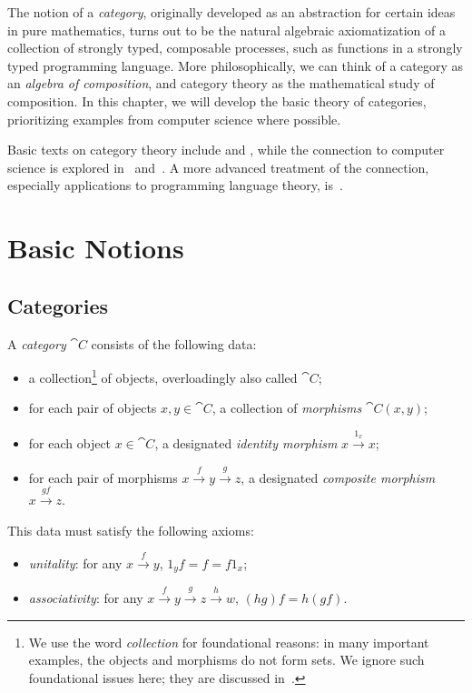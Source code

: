 
The notion of a \emph{category}, originally developed as an abstraction for
certain ideas in pure mathematics, turns out to be the natural algebraic
axiomatization of a collection of strongly typed, composable processes, such as
functions in a strongly typed programming language. More philosophically, we can
think of a category as an \emph{algebra of composition}, and category theory as
the mathematical study of composition. In this chapter, we will
develop the basic theory of categories, prioritizing examples from computer
science where possible.

Basic texts on category theory include \cite{maclane-1971} and
\cite{riehl-2017}, while the connection to computer science is explored
in~\cite{pierce-1991} and~\cite{barr-wells-1990}. A more advanced treatment of
the connection, especially applications to programming language theory,
is~\cite{jacobs-1999}.

\section{Basic Notions}

\subsection{Categories}

\begin{dfn}[category]\label{def:category}
	A \emph{category} $\cat{C}$ consists of the following data:
	\begin{itemize}
		\item a collection\footnote{We use the word \emph{collection} for foundational reasons: in
			      many important examples, the objects and morphisms do not form sets. We ignore
			      such foundational issues here; they are discussed in~\cite[subsection
				      1.6]{maclane-1971}.} of objects, overloadingly also called $\cat{C}$;
		\item for each pair of objects $x,y \in  \cat{C}$, a collection of \emph{morphisms} $\cat{C}(x, y)$;
		\item for each object $x \in \cat{C}$, a designated \emph{identity morphism} $x \xrightarrow{1_x}  x$;
		\item for each pair of morphisms $x \xrightarrow{f}  y \xrightarrow{g}  z$, a designated \emph{composite morphism} $x \xrightarrow{gf}  z$.
	\end{itemize}
	This data must satisfy the following axioms:
	\begin{itemize}
		\item \emph{unitality}: for any $x \xrightarrow{f}  y$, $1_yf = f = f1_x$;
		\item \emph{associativity}: for any $x \xrightarrow{f} 		y \xrightarrow{g} z \xrightarrow{h} w$, $(hg)f = h(gf)$.
	\end{itemize}
\end{dfn}

